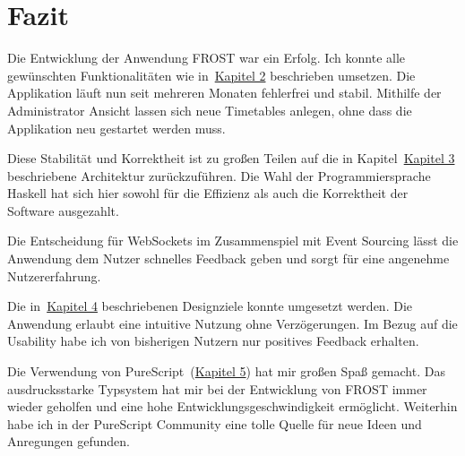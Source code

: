 \chapter{Fazit}
\label{cha:fazit}
Die Entwicklung der Anwendung FROST war ein Erfolg. Ich konnte alle gewünschten
Funktionalitäten wie in~\hyperref[cha:die-anwendung]{Kapitel 2} beschrieben
umsetzen. Die Applikation läuft nun seit mehreren Monaten fehlerfrei und stabil.
Mithilfe der Administrator Ansicht lassen sich neue Timetables anlegen, ohne
dass die Applikation neu gestartet werden muss.

Diese Stabilität und Korrektheit ist zu großen Teilen auf die in
Kapitel~\hyperref[cha:architektur]{Kapitel 3} beschriebene Architektur
zurückzuführen. Die Wahl der Programmiersprache Haskell hat sich hier sowohl für
die Effizienz als auch die Korrektheit der Software ausgezahlt.

Die Entscheidung für WebSockets im Zusammenspiel mit Event Sourcing lässt die
Anwendung dem Nutzer schnelles Feedback geben und sorgt für eine angenehme
Nutzererfahrung.

Die in~\hyperref[cha:user-interface]{Kapitel 4} beschriebenen Designziele konnte
umgesetzt werden. Die Anwendung erlaubt eine intuitive Nutzung ohne
Verzögerungen. Im Bezug auf die Usability habe ich von bisherigen Nutzern nur
positives Feedback erhalten.

Die Verwendung von PureScript~(\hyperref[cha:purescript]{Kapitel 5}) hat mir großen Spaß gemacht. Das ausdrucksstarke
Typsystem hat mir bei der Entwicklung von FROST immer wieder geholfen und eine
hohe Entwicklungsgeschwindigkeit ermöglicht. Weiterhin habe ich in der
PureScript Community eine tolle Quelle für neue Ideen und Anregungen gefunden.


